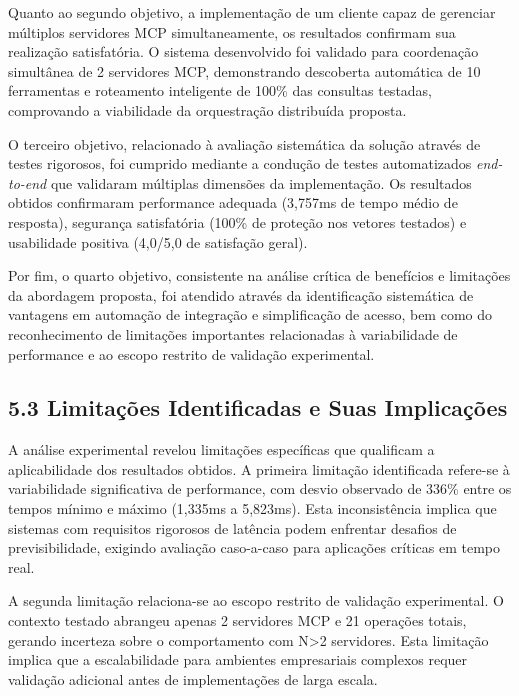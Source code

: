 \documentclass[
]{article}
\begin{document}
Quanto ao segundo objetivo, a implementação de um cliente capaz de
gerenciar múltiplos servidores MCP simultaneamente, os resultados
confirmam sua realização satisfatória. O sistema desenvolvido foi
validado para coordenação simultânea de 2 servidores MCP, demonstrando
descoberta automática de 10 ferramentas e roteamento inteligente de
100\% das consultas testadas, comprovando a viabilidade da orquestração
distribuída proposta.

O terceiro objetivo, relacionado à avaliação sistemática da solução
através de testes rigorosos, foi cumprido mediante a condução de testes
automatizados \emph{end-to-end} que validaram múltiplas dimensões da
implementação. Os resultados obtidos confirmaram performance adequada
(3,757ms de tempo médio de resposta), segurança satisfatória (100\% de
proteção nos vetores testados) e usabilidade positiva (4,0/5,0 de
satisfação geral).

Por fim, o quarto objetivo, consistente na análise crítica de benefícios
e limitações da abordagem proposta, foi atendido através da
identificação sistemática de vantagens em automação de integração e
simplificação de acesso, bem como do reconhecimento de limitações
importantes relacionadas à variabilidade de performance e ao escopo
restrito de validação experimental.

\subsection{5.3 Limitações Identificadas e Suas
Implicações}\label{limitauxe7uxf5es-identificadas-e-suas-implicauxe7uxf5es}

A análise experimental revelou limitações específicas que qualificam a
aplicabilidade dos resultados obtidos. A primeira limitação identificada
refere-se à variabilidade significativa de performance, com desvio
observado de 336\% entre os tempos mínimo e máximo (1,335ms a 5,823ms).
Esta inconsistência implica que sistemas com requisitos rigorosos de
latência podem enfrentar desafios de previsibilidade, exigindo avaliação
caso-a-caso para aplicações críticas em tempo real.

A segunda limitação relaciona-se ao escopo restrito de validação
experimental. O contexto testado abrangeu apenas 2 servidores MCP e 21
operações totais, gerando incerteza sobre o comportamento com
N\textgreater2 servidores. Esta limitação implica que a escalabilidade
para ambientes empresariais complexos requer validação adicional antes
de implementações de larga escala.
\end{document}
